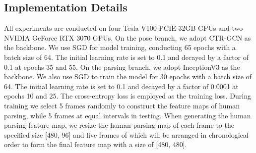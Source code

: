 \documentclass[runningheads]{llncs}
\begin{document}
\subsection{Implementation Details}
All experiments are conducted on four Tesla V100-PCIE-32GB GPUs and two NVIDIA GeForce RTX 3070 GPUs. On the pose branch, we adopt CTR-GCN \cite{CTR-GCN2021} as the backbone. We use SGD for model training, conducting 65 epochs with a batch size of 64. The initial learning rate is set to 0.1 and decayed by a factor of 0.1 at epochs 35 and 55. On the parsing branch, we adopt InceptionV3 \cite{szegedy2016rethinking} as the backbone. We also use SGD to train the model for 30 epochs with a batch size of 64. The initial learning rate is set to 0.1 and decayed by a factor of 0.0001 at epochs 10 and 25. The cross-entropy loss is employed as the training loss. During training we select 5 frames randomly to construct the feature maps of human parsing, while 5 frames at equal intervals in testing. When generating the human parsing feature map, we resize the human parsing map of each frame to the specified size [480, 96] and five frames of which will be arranged in chronological order to form the final feature map with a size of [480, 480].
\end{document}
